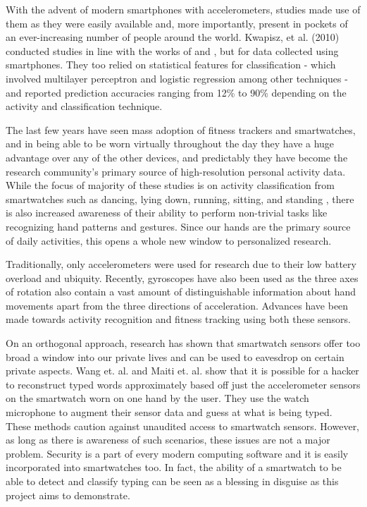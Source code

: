 \documentclass[10pt,twocolumn,letterpaper]{article}
\begin{document}
With the advent of modern smartphones with accelerometers, studies made use of them as they were easily available and, more importantly, present in pockets of an ever-increasing number of people around the world. Kwapisz, et al. (2010)\cite{weiss} conducted studies in line with the works of \cite{ravi} and \cite{bonomi}, but for data collected using smartphones. They too relied on statistical features for classification - which involved multilayer perceptron and logistic regression among other techniques - and reported prediction accuracies ranging from 12\% to 90\% depending on the activity and classification technique.

The last few years have seen mass adoption of fitness trackers and smartwatches, and in being able to be worn virtually throughout the day they have a huge advantage over any of the other devices, and predictably they have become the research community's primary source of high-resolution personal activity data. While the focus of majority of these studies is on activity classification from smartwatches such as dancing, lying down, running, sitting, and standing \cite{mannini} \cite{zheng}, there is also increased awareness of their ability to perform non-trivial tasks like recognizing hand patterns and gestures. Since our hands are the primary source of daily activities, this opens a whole new window to personalized research.

Traditionally, only accelerometers were used for research due to their low battery overload and ubiquity. Recently, gyroscopes have also been used as the three axes of rotation also contain a vast amount of distinguishable information about hand movements apart from the three directions of acceleration. Advances have been made towards activity recognition \cite{ravi} and fitness tracking \cite{dunn} using both these sensors.

On an orthogonal approach, research has shown that smartwatch sensors offer too broad a window into our private lives and can be used to eavesdrop on certain private aspects. Wang et. al. \cite{wang} and Maiti et. al. \cite{maiti} show that it is possible for a hacker to reconstruct typed words approximately based off just the accelerometer sensors on the smartwatch worn on one hand by the user. They use the watch microphone to augment their sensor data and guess at what is being typed. These methods caution against unaudited access to smartwatch sensors. However, as long as there is awareness of such scenarios, these issues are not a major problem. Security is a part of every modern computing software and it is easily incorporated into smartwatches too. In fact, the ability of a smartwatch to be able to detect and classify typing can be seen as a blessing in disguise as this project aims to demonstrate.
\end{document}
